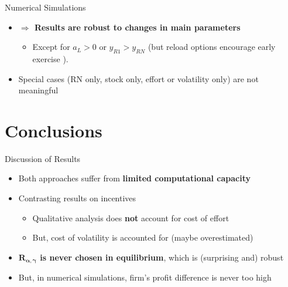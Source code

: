 \documentclass[compress]{beamer}
\begin{document}
\begin{frame}{Numerical Simulations}
    \begin{itemize}
        \item \textbf{ $\Rightarrow$ Results are robust to changes in main parameters }%
        \begin{itemize}
            \item Except for $a_L > 0$ or $y_{R1} > y_{RN}$ (but reload options encourage early exercise \citep{hemmer1998optimal}).
        \end{itemize}
        \item Special cases (RN only, stock only, effort or volatility only) are not meaningful
    \end{itemize}
\end{frame}



\section{Conclusions}
\begin{frame}{Discussion of Results}
    \begin{itemize}
        \item Both approaches suffer from \textbf{limited computational capacity}
        \item Contrasting results on incentives 
        \begin{itemize}
            \item Qualitative analysis does \textbf{not} account for cost of effort
            \item But, cost of volatility is accounted for (maybe overestimated)
        \end{itemize}
        \item \textbf{$\boldsymbol{R_{\alpha, \gamma}}$ is never chosen in equilibrium}, which is (surprising and) robust
        \item But, in numerical simulations, firm's profit difference is never too high
    \end{itemize}
\end{frame}
\end{document}
